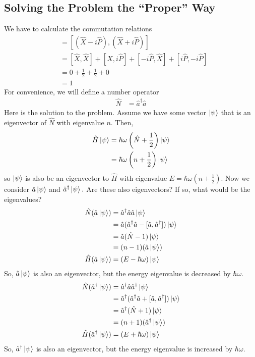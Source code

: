 \subsection{Solving the Problem the ``Proper'' Way}
We have to calculate the commutation relations
\begin{align}
    [\hat a,\hat a^\dagger]&=[(\hat X-i\hat P),(\hat X+i\hat P)]\\
    &=[\hat X, \hat X]+[\hat X,i\hat P]+[-i\hat P,\hat X]+[i\hat P,-i\hat P]\\
    &=0+\frac{1}{2}+\frac{1}{2}+0\\
    &=1
\end{align}
For convenience, we will define a number operator
\begin{align}
    \hat N &= \hat a^\dagger\hat a
\end{align}
Here is the solution to the problem. Assume we have some vector \(\ket\psi\) that is an eigenvector of \(\hat N\) with eigenvalue \(n.\) Then, 
\begin{align}
    \hat H\ket\psi&=\hbar\omega\left(\hat N+\frac{1}{2}\right)\ket\psi\\
    &=\hbar\omega\left(n+\frac{1}{2}\right)\ket\psi
\end{align}
so \(\ket\psi\) is also be an eigenvector to \(\hat H\) with eigenvalue \(E=\hbar\omega\left(n+\frac{1}{2}\right).\) Now we consider \(\hat a\ket\psi\) and \(\hat a^\dagger\ket\psi.\) Are these also eigenvectors? If so, what would be the eigenvalues?
\begin{align}
    \hat N(\hat a\ket\psi)&=\hat a^\dagger\hat a\hat a\ket\psi\\
    &=\hat a(\hat a^\dagger\hat a-[\hat a,\hat a^\dagger])\ket\psi\\
    &=\hat a(\hat N-1)\ket\psi\\
    &=(n-1)(\hat a\ket\psi)\\
    \hat H(\hat a\ket\psi)&=(E-\hbar\omega)\ket\psi
\end{align}
So, \(\hat a\ket\psi\) is also an eigenvector, but the energy eigenvalue is decreased by \(\hbar\omega.\)
\begin{align}
    \hat N(\hat a^\dagger\ket\psi)&=\hat a^\dagger\hat a\hat a^\dagger\ket\psi\\
    &=\hat a^\dagger(\hat a^\dagger\hat a+[\hat a,\hat a^\dagger])\ket\psi\\
    &=\hat a^\dagger(\hat N+1)\ket\psi\\
    &=(n+1)(\hat a^\dagger\ket\psi)\\
    \hat H(\hat a^\dagger\ket\psi)&=(E+\hbar\omega)\ket\psi
\end{align}
So, \(\hat a^\dagger\ket\psi\) is also an eigenvector, but the energy eigenvalue is increased by \(\hbar\omega.\)

